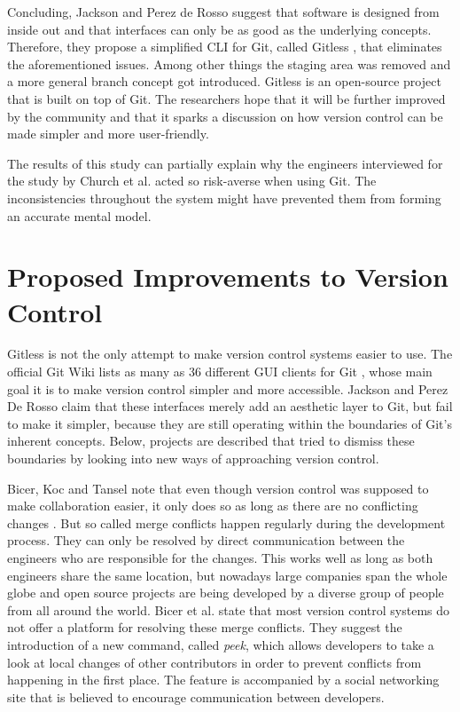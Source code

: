 Concluding, Jackson and Perez de Rosso suggest that software is designed from inside out and that interfaces can only be as good as the underlying concepts. Therefore, they propose a simplified \ac{CLI} for Git, called Gitless \cite{perez_de_rosso_gitless_2015}, that eliminates the aforementioned issues. Among other things the staging area was removed and a more general branch concept got introduced. Gitless is an open-source project that is built on top of Git. The researchers hope that it will be further improved by the community and that it sparks a discussion on how version control can be made simpler and more user-friendly.

The results of this study can partially explain why the engineers interviewed for the study by Church et al. \cite{church_case_2014}
acted so risk-averse when using Git. The inconsistencies throughout the system might have prevented them from forming an accurate mental model.

\section{Proposed Improvements to Version Control}
Gitless is not the only attempt to make version control systems easier to use. The official Git Wiki lists as many as 36 different GUI clients for Git \cite{_interfaces_2015}, whose main goal it is to make version control simpler and more accessible. Jackson and Perez De Rosso claim that these interfaces merely add an aesthetic layer to Git, but fail to make it simpler, because they are still operating within the boundaries of Git's inherent concepts. Below, projects are described that tried to dismiss these boundaries by looking into new ways of approaching version control.

Bicer, Koc and Tansel note that even though version control was supposed to make collaboration  easier, it only does so as long as there are no conflicting changes \cite{koc_towards_2012}. But so called merge conflicts happen regularly during the development process. They can only be resolved by direct communication between the engineers who are responsible for the changes. This works well as long as both engineers share the same location, but nowadays large companies span the whole globe and open source projects are being developed by a diverse group of people from all around the world. Bicer et al. state that most version control systems do not offer a platform for resolving these merge conflicts. They suggest the introduction of a new command, called \textit{peek}, which allows developers to take a look at local changes of other contributors in order to prevent conflicts from happening in the first place. The feature is accompanied by a social networking site that is believed to encourage communication between developers.

